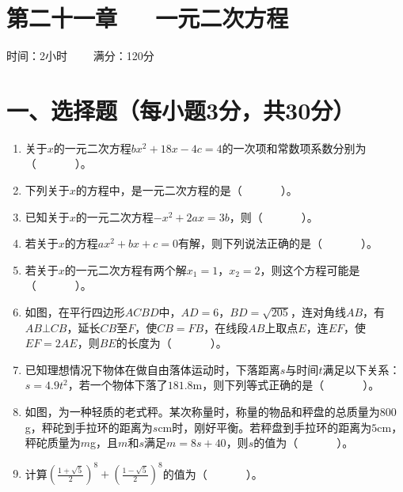 \documentclass[10pt]{article}
\begin{document}
\section*{\centering 第二十一章~~~一元二次方程}
\centerline{时间：2小时 \ \ \ \ 满分：120分}
\section*{\normalsize 一、选择题（每小题3分，共30分）}
\begin{enumerate}\setcounter{enumi}{0}
    \item 关于$x$的一元二次方程$bx^{2} + 18x - 4c = 4$的一次项和常数项系数分别为（~~~~~~~）。
    \item 下列关于$x$的方程中，是一元二次方程的是（~~~~~~~）。
    \item 已知关于$x$的一元二次方程$- x^{2} + 2ax = 3b$，则（~~~~~~~）。
    \item 若关于$x$的方程$ax^{2} + bx + c = 0$有解，则下列说法正确的是（~~~~~~~）。
    \item 若关于$x$的一元二次方程有两个解$x_{1} = 1$，$x_{2} = 2$，则这个方程可能是（~~~~~~~）。
    \item 如图，在平行四边形$ACBD$中，$AD=6$，$BD=\sqrt{205}$，连对角线$AB$，有$AB \bot CB$，延长$CB$至$F$，使$CB=FB$，在线段$AB$上取点$E$，连$EF$，使$EF=2AE$，则$BE$的长度为（~~~~~~~）。
    \item 已知理想情况下物体在做自由落体运动时，下落距离$s$与时间$t$满足以下关系：$s = 4.9t^{2}$，若一个物体下落了$181.8$m，则下列等式正确的是（~~~~~~~）。
    \item 如图，为一种轻质的老式秤。某次称量时，称量的物品和秤盘的总质量为$800$g，秤砣到手拉环的距离为$s$cm时，刚好平衡。若秤盘到手拉环的距离为$5$cm，秤砣质量为$m$g，且$m$和$s$满足$m=8s+40$，则$s$的值为（~~~~~~~）。
    \item 计算$(\frac{1+\sqrt{5}}{2})^8+(\frac{1-\sqrt{5}}{2})^8$的值为（~~~~~~~）。

\end{enumerate}
\end{document}
